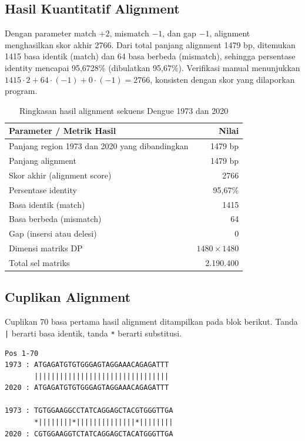 \documentclass[conference]{IEEEtran}
\begin{document}
\subsection{Hasil Kuantitatif Alignment}
Dengan parameter match $+2$, mismatch $-1$, dan gap $-1$, alignment menghasilkan skor akhir 2766. Dari total panjang alignment 1479 bp, ditemukan 1415 basa identik (match) dan 64 basa berbeda (mismatch), sehingga persentase identity mencapai 95,6728\% (dibulatkan 95,67\%). Verifikasi manual menunjukkan $1415 \cdot 2 + 64 \cdot (-1) + 0 \cdot (-1) = 2766$, konsisten dengan skor yang dilaporkan program.

\begin{table}[h]
\centering
\caption{Ringkasan hasil alignment sekuens Dengue 1973 dan 2020}
\label{tab:hasil}
\renewcommand{\arraystretch}{1.1}
\begin{tabular}{p{} r}
\toprule
\textbf{Parameter / Metrik Hasil} & \textbf{Nilai} \\
\midrule
Panjang region 1973 dan 2020 yang dibandingkan & 1479 bp \\
Panjang alignment                & 1479 bp \\
Skor akhir (alignment score)     & 2766 \\
Persentase identity              & 95,67\% \\
Basa identik (match)             & 1415 \\
Basa berbeda (mismatch)          & 64 \\
Gap (insersi atau delesi)        & 0 \\
Dimensi matriks DP               & $1480 \times 1480$ \\
Total sel matriks                & 2.190.400 \\
\bottomrule
\end{tabular}
\end{table}

\subsection{Cuplikan Alignment}
Cuplikan 70 basa pertama hasil alignment ditampilkan pada blok berikut. Tanda \texttt{|} berarti basa identik, tanda \texttt{*} berarti substitusi.

\begin{center}
\footnotesize
\begin{lstlisting}[frame=none]
Pos 1-70
1973 : ATGAGATGTGTGGGAGTAGGAAACAGAGATTT
       ||||||||||||||||||||||||||||||||
2020 : ATGAGATGTGTGGGAGTAGGAAACAGAGATTT

1973 : TGTGGAAGGCCTATCAGGAGCTACGTGGGTTGA
       *||||||||*||||||||||||||*||||||||
2020 : CGTGGAAGGTCTATCAGGAGCTACATGGGTTGA
\end{lstlisting}
\end{center}
\end{document}
